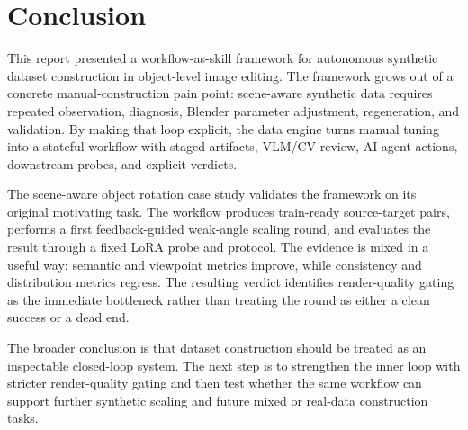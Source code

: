 \section{Conclusion}
\label{sec:conclusion}

This report presented a workflow-as-skill framework for autonomous synthetic dataset construction in object-level image editing. The framework grows out of a concrete manual-construction pain point: scene-aware synthetic data requires repeated observation, diagnosis, Blender parameter adjustment, regeneration, and validation. By making that loop explicit, the data engine turns manual tuning into a stateful workflow with staged artifacts, VLM/CV review, AI-agent actions, downstream probes, and explicit verdicts.

The scene-aware object rotation case study validates the framework on its original motivating task. The workflow produces train-ready source-target pairs, performs a first feedback-guided weak-angle scaling round, and evaluates the result through a fixed LoRA probe and \spatialedit{} protocol. The evidence is mixed in a useful way: semantic and viewpoint metrics improve, while consistency and distribution metrics regress. The resulting \inspect{} verdict identifies render-quality gating as the immediate bottleneck rather than treating the round as either a clean success or a dead end.

The broader conclusion is that dataset construction should be treated as an inspectable closed-loop system. The next step is to strengthen the inner loop with stricter render-quality gating and then test whether the same workflow can support further synthetic scaling and future mixed or real-data construction tasks.
